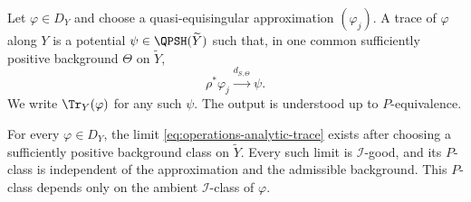 \begin{definition}
\label{def:operations-analytic-trace}
Let $\varphi\in D_Y$ and choose a quasi-equisingular approximation
$(\varphi_j)$.  A trace of $\varphi$ along $Y$ is a potential
$\psi\in\QPSH(\widetilde Y)$ such that, in one common sufficiently
positive background $\Theta$ on $\widetilde Y$,
\[
                 \rho^*\varphi_j
                 \xrightarrow{d_{S,\Theta}}\psi.
\tag{54.22}\label{eq:operations-analytic-trace}
\]
We write $\Tr_Y(\varphi)$ for any such $\psi$.
The output is understood up to $P$-equivalence.
\end{definition}

\begin{theorem}\label{thm:operations-trace-well-defined}
For every $\varphi\in D_Y$, the limit
\eqref{eq:operations-analytic-trace} exists after choosing a sufficiently
positive background class on $\widetilde Y$.
Every such limit is $\mathcal I$-good, and its $P$-class is independent
of the approximation and the admissible background.
This $P$-class depends only on the ambient $\mathcal I$-class of
$\varphi$.
\end{theorem}

